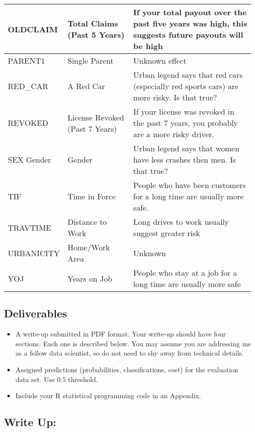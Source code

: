 \documentclass[
]{article}
\providecommand{\tightlist}{%
  \setlength{\itemsep}{0pt}\setlength{\parskip}{0pt}}
\begin{document}
\begin{table}[H]
{\begin{tabular}{l|l|>{\raggedright\arraybackslash}p{20em}}
\hline
OLDCLAIM & Total Claims (Past 5 Years) & If your total payout over the past five years  was high, this suggests future payouts will be high\\
\hline
PARENT1 & Single Parent & Unknown effect\\
\hline
RED\_CAR & A Red Car & Urban legend says that red cars (especially red  sports cars) are more risky. Is that true?\\
\hline
REVOKED & License Revoked (Past 7 Years) & If your license was revoked in the past 7 years,  you probably are a more risky driver.\\
\hline
SEX Gender & Gender & Urban legend says that women have less crashes  then men. Is that true?\\
\hline
TIF & Time in Force & People who have been customers for a long time  are usually more safe.\\
\hline
TRAVTIME & Distance to Work & Long drives to work usually suggest greater risk\\
\hline
URBANICITY & Home/Work Area & Unknown\\
\hline
YOJ & Years on Job & People who stay at a job for a long time are usually more safe\\
\hline
\end{tabular}}
\end{table}

\hfill\break

\hypertarget{deliverables}{%
\subsection{Deliverables}\label{deliverables}}

\begin{itemize}
\tightlist
\item
  A write-up submitted in PDF format. Your write-up should have four
  sections. Each one is described below. You may assume you are
  addressing me as a fellow data scientist, so do not need to shy away
  from technical details.
\item
  Assigned predictions (probabilities, classifications, cost) for the
  evaluation data set. Use 0.5 threshold.
\item
  Include your R statistical programming code in an Appendix.
\end{itemize}

\hypertarget{write-up}{%
\subsection{Write Up:}\label{write-up}}
\end{document}
